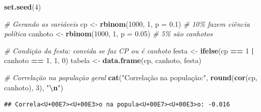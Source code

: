\documentclass[
]{article}
\newenvironment{Shaded}{\begin{snugshade}}{\end{snugshade}}
\newcommand{\AttributeTok}[1]{\textcolor[rgb]{0.13,0.29,0.53}{#1}}
\newcommand{\CommentTok}[1]{\textcolor[rgb]{0.56,0.35,0.01}{\textit{#1}}}
\newcommand{\DecValTok}[1]{\textcolor[rgb]{0.00,0.00,0.81}{#1}}
\newcommand{\FloatTok}[1]{\textcolor[rgb]{0.00,0.00,0.81}{#1}}
\newcommand{\FunctionTok}[1]{\textcolor[rgb]{0.13,0.29,0.53}{\textbf{#1}}}
\newcommand{\NormalTok}[1]{#1}
\newcommand{\OtherTok}[1]{\textcolor[rgb]{0.56,0.35,0.01}{#1}}
\newcommand{\SpecialCharTok}[1]{\textcolor[rgb]{0.81,0.36,0.00}{\textbf{#1}}}
\newcommand{\StringTok}[1]{\textcolor[rgb]{0.31,0.60,0.02}{#1}}
\begin{document}
\begin{Shaded}
\begin{Highlighting}[]
\FunctionTok{set.seed}\NormalTok{(}\DecValTok{4}\NormalTok{)}

\CommentTok{\# Gerando as variáveis}
\NormalTok{cp }\OtherTok{\textless{}{-}} \FunctionTok{rbinom}\NormalTok{(}\DecValTok{1000}\NormalTok{, }\DecValTok{1}\NormalTok{, }\AttributeTok{p =} \FloatTok{0.1}\NormalTok{)       }\CommentTok{\# 10\% fazem ciência política}
\NormalTok{canhoto }\OtherTok{\textless{}{-}} \FunctionTok{rbinom}\NormalTok{(}\DecValTok{1000}\NormalTok{, }\DecValTok{1}\NormalTok{, }\AttributeTok{p =} \FloatTok{0.05}\NormalTok{) }\CommentTok{\# 5\% são canhotos}

\CommentTok{\# Condição da festa: convida se faz CP ou é canhoto}
\NormalTok{festa }\OtherTok{\textless{}{-}} \FunctionTok{ifelse}\NormalTok{(cp }\SpecialCharTok{==} \DecValTok{1} \SpecialCharTok{|}\NormalTok{ canhoto }\SpecialCharTok{==} \DecValTok{1}\NormalTok{, }\DecValTok{1}\NormalTok{, }\DecValTok{0}\NormalTok{)}
\NormalTok{tabela }\OtherTok{\textless{}{-}} \FunctionTok{data.frame}\NormalTok{(cp, canhoto, festa)}

\CommentTok{\# Correlação na população geral}
\FunctionTok{cat}\NormalTok{(}\StringTok{"Correlação na população:"}\NormalTok{, }\FunctionTok{round}\NormalTok{(}\FunctionTok{cor}\NormalTok{(cp, canhoto), }\DecValTok{3}\NormalTok{), }\StringTok{"}\SpecialCharTok{\textbackslash{}n}\StringTok{"}\NormalTok{)}
\end{Highlighting}
\end{Shaded}

\begin{verbatim}
## Correla<U+00E7><U+00E3>o na popula<U+00E7><U+00E3>o: -0.016
\end{verbatim}

\begin{Shaded}
\end{Shaded}
\end{document}
